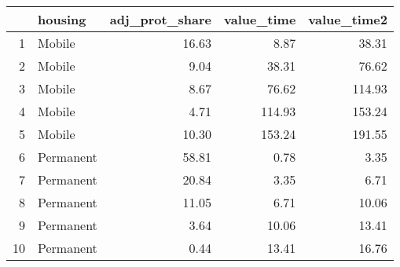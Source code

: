 \begin{table}[ht]
\centering
\begin{tabular}{rlrrr}
  \hline
 & housing & adj\_prot\_share & value\_time & value\_time2 \\ 
  \hline
1 & Mobile & 16.63 & 8.87 & 38.31 \\ 
  2 & Mobile & 9.04 & 38.31 & 76.62 \\ 
  3 & Mobile & 8.67 & 76.62 & 114.93 \\ 
  4 & Mobile & 4.71 & 114.93 & 153.24 \\ 
  5 & Mobile & 10.30 & 153.24 & 191.55 \\ 
  6 & Permanent & 58.81 & 0.78 & 3.35 \\ 
  7 & Permanent & 20.84 & 3.35 & 6.71 \\ 
  8 & Permanent & 11.05 & 6.71 & 10.06 \\ 
  9 & Permanent & 3.64 & 10.06 & 13.41 \\ 
  10 & Permanent & 0.44 & 13.41 & 16.76 \\ 
   \hline
\end{tabular}
\end{table}
